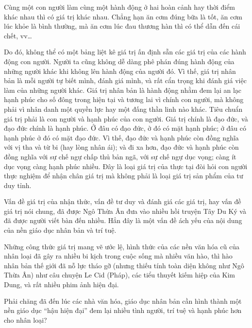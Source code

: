 Cùng một con người làm cùng một hành động ở hai hoàn cảnh hay thời điểm khác nhau thì có giá trị khác nhau. Chẳng hạn ăn cơm đúng bữa là tốt, ăn cơm lúc khỏe là bình thường, mà ăn cơm lúc đau thương hàn thì có thể dẫn đến cái chết, vv\ldots

Do đó, không thể có một bảng liệt kê giá trị ấn định sẵn các giá trị của các hành động con người. Người ta cũng không dễ dàng phê phán đúng hành động của những người khác khi không lên hành động của người đó. Vì thế, giá trị nhân bản là mỗi người tự biết mình, đánh giá mình, và rất cẩn trọng khi đánh giá việc làm của những người khác. Giá trị nhân bản là hành động nhằm đem lại an lạc hạnh phúc cho số đông trong hiện tại và tương lai vì chính con người, mà không phải vì nhân danh một quyền lực hay một đấng thần linh nào khác. Tiêu chuẩn giá trị phải là con người và hạnh phúc của con người. Giá trị chính là đạo đức, và đạo đức chính là hạnh phúc. Ở đâu có đạo đức, ở đó có mặt hạnh phúc; ở đâu có hạnh phúc ở đó có mặt đạo đức. Vì thế, đạo đức và hạnh phúc còn đồng nghĩa với vị tha và từ bi (hay lòng nhân ái); và đi xa hơn, đạo đức và hạnh phúc còn đồng nghĩa với sự chế ngự chấp thủ bản ngã, với sự chế ngự dục vọng; càng ít dục vọng càng hạnh phúc nhiều. Đây là loại giá trị của thực tại đòi hỏi con người thực nghiệm để nhận chân giá trị mà không phải là loại giá trị sản phẩm của tư duy tỉnh.

Vấn đề giá trị của nhận thức, vấn đề tư duy và đánh giá các giá trị, hay vấn đề giá trị nói chung, đã được Ngô Thừa Ân đưa vào nhiều hồi truyện Tây Du Ký và đã được người viết bàn đến nhiều. Hẳn đây là một vấn đề ách yếu của nội dung của nền giáo dục nhân bản và trí tuệ.

Những công thức giá trị mang vẽ ước lệ, hình thức của các nền văn hóa cũ của nhân loại đã gây ra nhiều bi kịch trong cuộc sống mà nhiều văn hào, thì hào nhân bản thế giới đã nỗ lực tháo gỡ (nhưng thiếu tính toàn diện không như Ngô Thừa Ân) như câu chuyện Le Cid (Pháp), các tiểu thuyết kiếm hiệp của Kim Dung, và rất nhiều phim ảnh hiện đại.

Phải chăng đã đến lúc các nhà văn hóa, giáo dục nhân bản cần hình thành một nền giáo dục ``hậu hiện đại'' đem lại nhiều tình người, trí tuệ và hạnh phúc hơn cho nhân loại?
